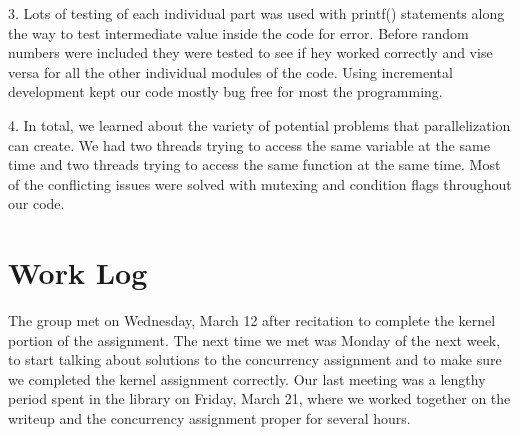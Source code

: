 \documentclass[draftclsnofoot,onecolumn,10pt]{article}
\begin{document}
	    \begin{flushleft}
    	3. Lots of testing of each individual part was used with printf() statements along the way to test intermediate value inside the code for error. Before random numbers were included they were tested to see if hey worked correctly and vise versa for all the other individual modules of the code. Using incremental development kept our code mostly bug free for most the programming.
    	\end{flushleft}
    	
        \begin{flushleft}
    	4. In total, we learned about the variety of potential problems that parallelization can create. We had two threads trying to access the same variable at the same time and two threads trying to access the same function at the same time. Most of the conflicting issues were solved with mutexing and condition flags throughout our code.

        \end{flushleft}
            
    \section{Work Log}
        \begin{flushleft}
        The group met on Wednesday, March 12 after recitation to complete the kernel portion of the assignment. The next time we met was Monday of the next week, to start talking about solutions to the concurrency assignment and to make sure we completed the kernel assignment correctly. Our last meeting was a lengthy period spent in the library on Friday, March 21, where we worked together on the writeup and the concurrency assignment proper for several hours. 
        \end{flushleft}
            
\end{document}
